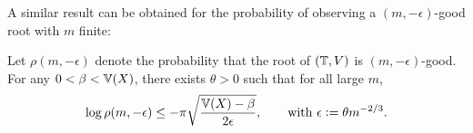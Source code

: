 A similar result can be obtained for the probability of observing a $(m, - \epsilon)$-good root with $m$ finite:
\begin{theorem}\label{thm:finite_good}
Let $\rho(m, - \epsilon)$ denote the probability that the root of $(\mathbb{T}, V)$ is $(m, - \epsilon)$-good. For any $0 < \beta < \mathbb{V}(X)$, there exists $\theta > 0$ such that for all large $m$, 
\begin{equation}\nonumber
\log \rho(m, - \epsilon) \leq - \pi \sqrt{\frac{\mathbb{V}(X) - \beta}{2 \epsilon}}, \qquad \text{with } \epsilon \vcentcolon= \theta m^{-2/3}. 
\end{equation}
\end{theorem}

\newpage